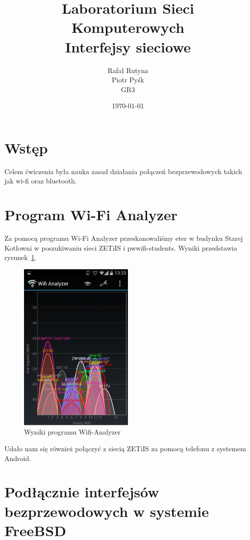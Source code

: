 \documentclass[a4paper,11pt,notitlepage]{article}
\author{Rafał Rutyna \\ Piotr Pyśk \\ GR3}
\title{Laboratorium Sieci Komputerowych \\ {\small Interfejsy sieciowe}}
\date{\today}
\begin{document}
\maketitle
\newpage
\tableofcontents
\newpage

\section{Wstęp}

Celem ćwiczenia była nauka zasad działania połączeń bezprzewodowych takich jak wi-fi oraz bluetooth.

\section{Program Wi-Fi Analyzer}

Za pomocą programu Wi-Fi Analyzer przeskanowaliśmy eter w budynku Starej 
Kotłowni w poszukiwaniu sieci ZETiIS i pwwifi-students.
Wyniki przedstawia rysunek~\ref{wifi-analyzer}.

\begin{figure}[htb]
  \centering
  \includegraphics[width=0.5\textwidth]{analyzer.png}
  \caption{Wyniki programu Wifi-Analyzer}
  \label{wifi-analyzer}
\end{figure}

Udało nam się również połączyć z siecią ZETiIS za pomocą telefonu z systemem Android.

\section{Podłącznie interfejsów bezprzewodowych w systemie FreeBSD}
\end{document}
